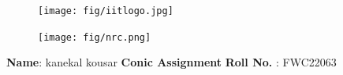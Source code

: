 \documentclass[10pt,a4paper]{report}
\begin{document}
\begin{figure}[!tbp]
  \centering
  \begin{minipage}[b]{0.4\textwidth}
    \texttt{[image: fig/iitlogo.jpg]} 
  \end{minipage}
  \hfill
  \vspace{5mm}\begin{minipage}[b]{0.4\textwidth}
\raggedleft  \texttt{[image: fig/nrc.png]}  \

  \end{minipage}\vspace{0.2cm}
\end{figure}
\raggedright \textbf{Name}:\hspace{1mm} kanekal kousar\hspace{3cm} \Large \textbf{Conic Assignment}\hspace{2.5cm} %
\normalsize \textbf{Roll No.} :\hspace{1mm} FWC22063\vspace{1cm}
\end{document}
